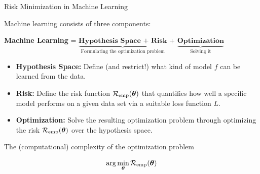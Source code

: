 \begin{vbframe}{Risk Minimization in Machine Learning}
		
Machine learning consists of three components: 

\begin{center}

  \textbf{Machine Learning} = $\underbrace{\textbf{Hypothesis Space + Risk}}_{\text{Formulating the optimization problem}}$ + $\underbrace{\textbf{Optimization}}_{\text{Solving it}}$
  
\end{center}

\lz

\begin{itemize}

  \item \textbf{Hypothesis Space:} Define (and restrict!) what kind of model 
  $f$ can be learned from the data.
  
  \item \textbf{Risk:} Define the risk function $\mathcal{R}_{\text{emp}}(\bm{\theta})$ that quantifies how well a specific model performs on a given 
  data set via a suitable loss function $L$.
  
  \item \textbf{Optimization:} Solve the resulting optimization problem through optimizing the risk $\mathcal{R}_{\text{emp}}(\bm{\theta})$ over the hypothesis space.
  
\end{itemize}

\framebreak 

The (computational) complexity of the optimization problem 

$$
\text{arg} \min_{\bm{\theta}} \mathcal{R}_{\text{emp}}(\bm{\theta})
$$


\end{vbframe}
